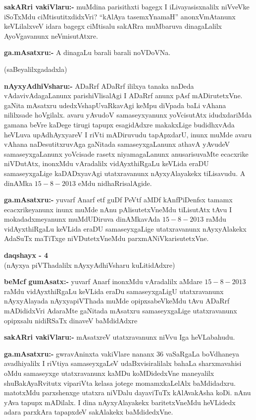 \smallskip
\noindent
\textbf{sakARri vakiVlaru:-} muMdina parisithxti bagegx I iLivayasisxnalilx niVveVke iSoTxMdu ciMtisutitxdidxVri? ``kAlAya tasemxYnamaH'' anonxVmAtanunx keVLilalxveV idara bagegx ciMtisalu sakARra muMbaruva dinagaLalilx AyoVgavanunx neVmisutAtxre.

\smallskip
\noindent
\textbf{ga.mAsatxru:-} A dinagaLu barali barali noVDoVNa.

\begin{center}
(saBeyalilxgadadxla)
\end{center}

\smallskip
\noindent
\textbf{nAyxyAdhiVsharu:-} ADaRrf ADaRrf ililxya tanaka naDeda vAdavivAdagaLanunx parishiVlisalAgi I ADaRrf anunx pAsf mADirutetxVne. gaNita mAsatxru udedxVshapUvaRkavAgi keMpu diVpada baLi vAhana nililxsade hoVgilalx. avaru yAvudoV samaseyxyanunx yoVcisutAtx idudxdariMda gamana beVre kaDege tirugi tapupx esagidAdxre makakxLige budidhxvAda heVLuva upAdhAyxyareV I riVti mADiruvudu tapApxdarU, inunx muMde avaru vAhana naDesutitxruvAga gaNitada samaseyxgaLanunx athavA yAvudeV samaseyxgaLanunx yoVcisade rasetx niyamagaLanunx anusarisuvaMte ecacxrike niVDutAtx, inonxMdu vAradalilx vidAyxthiRgaLu keVLida eraDU samaseyxgaLige kaDADxyavAgi utatxravanunx nAyxyAlayakekx tiLisavudu. A dinAMka $15-8-2013$ eMdu nidhaRrisalAgide.

\smallskip
\noindent
\textbf{ga.mAsatxru:-} yuvarf Anarf etf guDf PeVtf aMDf kAnfPiDenfsx tamamx ecacxrikeyanunx inunx muMde nAnu pAlisutetxVneMdu tiLisutAtx tAvu I mokadadxmeyanunx muMdUDiruva dinAMkavAda $15-8-2013$ raMdu vidAyxthiRgaLu keVLida eraDU samaseyxgaLige utatxravanunx nAyxyAlakekx AdaSuTx maTiTxge niVDutetxVneMdu parxmANiVkarisutetxVne.

\begin{center}
{\bf  daqshayx - {\rm 4}}\\
(nAyxya piVThadalilx nAyxyAdhiVsharu kuLitidAdxre)
\end{center}

\smallskip
\noindent
\textbf{beMcf gumAsatx:-} yuvarf Anarf inonxMdu vAradalilx aMdare $15-8-2013$ raMdu vidAyxthiRgaLu keVLida eraDu samaseyxgaLigU utatxravanunx nAyxyAlayada nAyxyapiVThada muMde opipxsabeVkeMdu tAvu ADaRrf mADididxVri AdaraMte gaNitada mAsatxru samaseyxgaLige utatxravanunx opipxsalu nidiRSaTx dinaveV baMdidAdxre

\smallskip
\noindent
\textbf{sakARri vakiVlaru:-} mAsatxreV utatxravanunx niVvu Iga heVLabahudu.

\smallskip
\noindent
\textbf{ga.mAsatxru:-} gwravAninxta vakiVlare nananx {\rm 36} vaSaRgaLa boVdhaneya avadhiyalilx I riVtiya samaseyxgaLeV udaBxvisiralilalx bahaLa sharxmavahisi oMdu samaseyxge utatxravanunx kaMDu koMDidedxVne maneyalilx shuBakAyaRvitutx vipariVta kelasa jotege momamxkaLelAlx baMdidadxru. matotxMdu parxshenxge utatxra niVDalu dayaviTuTx kAlAvakAsha koDi. nAnu yAva tapupx mADilalx. I dina nAyxyAlayakekx baritetxVneMdu heVLidedx adara parxkAra tapapxdeV sakAlakekx baMdidedxVne.

